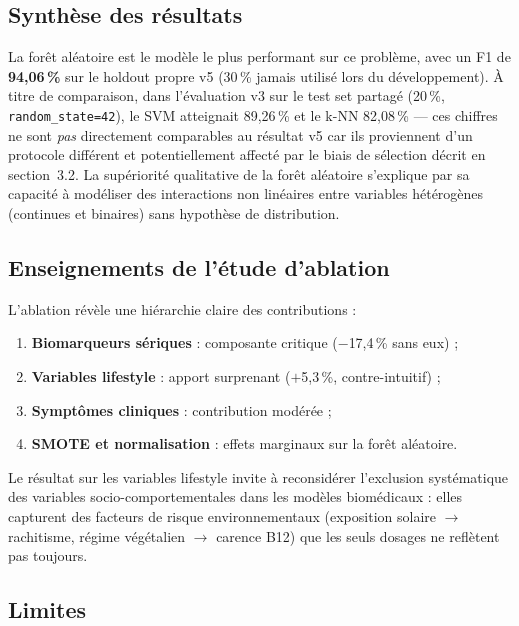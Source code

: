 \documentclass[12pt,a4paper]{article}
\begin{document}
\subsection{Synthèse des résultats}

La forêt aléatoire est le modèle le plus performant sur ce problème, avec un F1
de \textbf{94,06\,\%} sur le holdout propre v5 (30\,\% jamais utilisé lors du
développement). À titre de comparaison, dans l'évaluation v3 sur le test set
partagé (20\,\%, \texttt{random\_state=42}), le SVM atteignait 89,26\,\% et le
k-NN 82,08\,\% --- ces chiffres ne sont \emph{pas} directement comparables au
résultat v5 car ils proviennent d'un protocole différent et potentiellement
affecté par le biais de sélection décrit en section~3.2. La supériorité
qualitative de la forêt aléatoire s'explique par sa capacité à modéliser des
interactions non linéaires entre variables hétérogènes (continues et binaires)
sans hypothèse de distribution.

\subsection{Enseignements de l'étude d'ablation}

L'ablation révèle une hiérarchie claire des contributions :
\begin{enumerate}[leftmargin=2em]
    \item \textbf{Biomarqueurs sériques} : composante critique ($-$17,4\,\% sans eux) ;
    \item \textbf{Variables lifestyle} : apport surprenant ($+$5,3\,\%, contre-intuitif) ;
    \item \textbf{Symptômes cliniques} : contribution modérée ;
    \item \textbf{SMOTE et normalisation} : effets marginaux sur la forêt aléatoire.
\end{enumerate}

Le résultat sur les variables lifestyle invite à reconsidérer l'exclusion
systématique des variables socio-comportementales dans les modèles biomédicaux :
elles capturent des facteurs de risque environnementaux (exposition solaire $\to$
rachitisme, régime végétalien $\to$ carence B12) que les seuls dosages ne reflètent
pas toujours.

\subsection{Limites}
\end{document}
